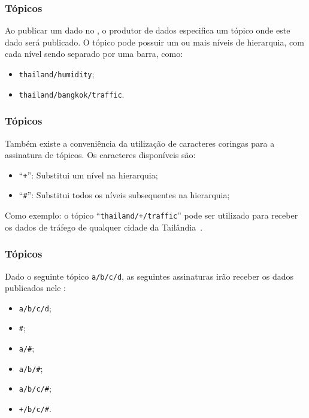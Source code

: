 \documentclass[aspectratio=169]{beamer}
\begin{document}
\begin{frame}
	\frametitle{Tópicos \mqtt}
	Ao publicar um dado no \broker \mqtt, o produtor de dados especifica um tópico onde este dado será publicado.
	O tópico pode possuir um ou mais níveis de hierarquia, com cada nível sendo separado por uma barra, como:
	\begin{itemize}
		\item \texttt{thailand/humidity};
		\item \texttt{thailand/bangkok/traffic}.
	\end{itemize}
\end{frame}

\begin{frame}
	\frametitle{Tópicos \mqtt}
	Também existe a conveniência da utilização de caracteres coringas para a assinatura de tópicos.
	Os caracteres disponíveis são:
	\begin{itemize}
		\item ``\texttt{+}'': Substitui um nível na hierarquia;
		\item ``\texttt{\#}'': Substitui todos os níveis subsequentes na hierarquia;
	\end{itemize}
	
	Como exemplo: o tópico ``\texttt{thailand/+/traffic}'' pode ser utilizado para receber os dados de tráfego de qualquer cidade da Tailândia~\cite{hunkeler:truong:stanford-clark:2008}.
\end{frame}

\begin{frame}
	\frametitle{Tópicos \mqtt}
	Dado o seguinte tópico \texttt{a/b/c/d}, as seguintes assinaturas irão receber os dados publicados nele \cite{light:mosquitto}:
	\begin{itemize}
		\item \texttt{a/b/c/d};
		\item \texttt{\#};
		\item \texttt{a/\#};
		\item \texttt{a/b/\#};
		\item \texttt{a/b/c/\#};
		\item \texttt{+/b/c/\#}.
	\end{itemize}

	
\end{frame}
\end{document}
